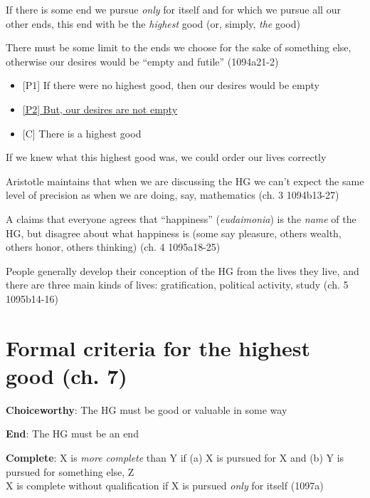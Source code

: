 \documentclass[11pt]{article}
\begin{document}
\noindent [5] If there is some end we pursue \emph{only} for itself and for which we pursue all our other ends, this end with be the \emph{highest} good (or, simply, \emph{the} good) 

\vspace*{2mm}

\noindent [6] There must be some limit to the ends we choose for the sake of something else, otherwise our desires would be ``empty and futile'' (1094a21-2)
\begin{itemize}\item{[P1] If there were no highest good, then our desires would be empty}\item{\underline{[P2] But, our desires are not empty}}\item{[C] There is a highest good}\end{itemize}

\noindent [7] If we knew what this highest good was, we could order our lives correctly
\vspace*{2mm}

\noindent [8] Aristotle maintains that when we are discussing the HG we can't expect the same level of precision as when we are doing, say, mathematics (ch. 3 1094b13-27)
\vspace*{2mm} 

\noindent [9] A claims that everyone agrees that ``happiness'' (\emph{eudaimonia}) is the \emph{name} of the HG, but disagree about what happiness is (some say pleasure, others wealth, others honor, others thinking) (ch. 4 1095a18-25)
\vspace*{2mm}

\noindent [10] People generally develop their conception of the HG from the lives they live, and there are three main kinds of lives: gratification, political activity, study (ch. 5 1095b14-16)

\section*{Formal criteria for the highest good (ch. 7)}

\noindent [A] \textbf{Choiceworthy}: The HG must be good or valuable in some way
\vspace*{1mm}

\noindent [B] \textbf{End}: The HG must be an end
\vspace*{1mm}

\noindent [C] \textbf{Complete}: X is \emph{more complete} than Y if (a) X is pursued for X and (b) Y is pursued for something else, Z\\\hspace*{24mm}X is complete without qualification if X is pursued \emph{only} for itself (1097a)
\vspace*{1mm}
\end{document}
